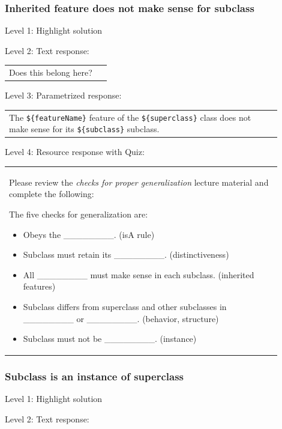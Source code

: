 \subsubsection{Inherited feature does not make sense for subclass}

\noindent Level 1: Highlight solution \medskip

\noindent Level 2: Text response: \medskip

\begin{tabular}{|p{0.9\linewidth}}
Does this belong here?
\end{tabular} \medskip

\noindent Level 3: Parametrized response: \medskip

\begin{tabular}{|p{0.9\linewidth}}
The \verb|${featureName}| feature of the \verb|${superclass}| class does not make sense for its \verb|${subclass}| subclass.
\end{tabular} \medskip

\noindent Level 4: Resource response with Quiz: \medskip

\begin{tabular}{|p{0.9\linewidth}}
Please review the \textit{checks for proper generalization} lecture material
and complete the following:

The five checks for generalization are:
\begin{itemize}
    \item Obeys the \_\_\_\_\_\_\_\_. (isA rule)
    \item Subclass must retain its \_\_\_\_\_\_\_\_. (distinctiveness)
    \item All \_\_\_\_\_\_\_\_ must make sense in each subclass. (inherited features)
    \item Subclass differs from superclass and other subclasses in \_\_\_\_\_\_\_\_ or \_\_\_\_\_\_\_\_. (behavior, structure)
    \item Subclass must not be \_\_\_\_\_\_\_\_. (instance)
\end{itemize}

\end{tabular} \medskip


\subsubsection{Subclass is an instance of superclass}

\noindent Level 1: Highlight solution \medskip

\noindent Level 2: Text response: \medskip

